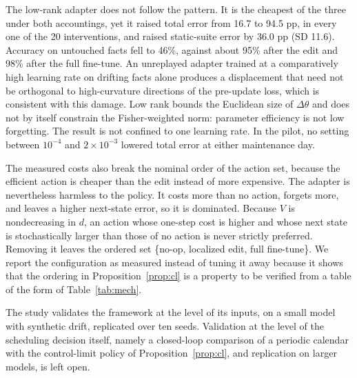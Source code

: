 \documentclass[journal]{IEEEtran}
\begin{document}
The low-rank adapter does not follow the pattern. It is the cheapest of the three under both accountings, yet it raised total error from 16.7 to 94.5 pp, in every one of the 20 interventions, and raised static-suite error by 36.0 pp (SD 11.6). Accuracy on untouched facts fell to 46\%, against about 95\% after the edit and 98\% after the full fine-tune. An unreplayed adapter trained at a comparatively high learning rate on drifting facts alone produces a displacement that need not be orthogonal to high-curvature directions of the pre-update loss, which is consistent with this damage. Low rank bounds the Euclidean size of $\Delta\theta$ and does not by itself constrain the Fisher-weighted norm: parameter efficiency is not low forgetting. The result is not confined to one learning rate. In the pilot, no setting between $10^{-4}$ and $2\times10^{-3}$ lowered total error at either maintenance day.

The measured costs also break the nominal order of the action set, because the efficient action is cheaper than the edit instead of more expensive. The adapter is nevertheless harmless to the policy. It costs more than no action, forgets more, and leaves a higher next-state error, so it is dominated. Because $V$ is nondecreasing in $d$, an action whose one-step cost is higher and whose next state is stochastically larger than those of no action is never strictly preferred. Removing it leaves the ordered set \{no-op, localized edit, full fine-tune\}. We report the configuration as measured instead of tuning it away because it shows that the ordering in Proposition~\ref{prop:cl} is a property to be verified from a table of the form of Table~\ref{tab:mech}.

The study validates the framework at the level of its inputs, on a small model with synthetic drift, replicated over ten seeds. Validation at the level of the scheduling decision itself, namely a closed-loop comparison of a periodic calendar with the control-limit policy of Proposition~\ref{prop:cl}, and replication on larger models, is left open.
\end{document}
